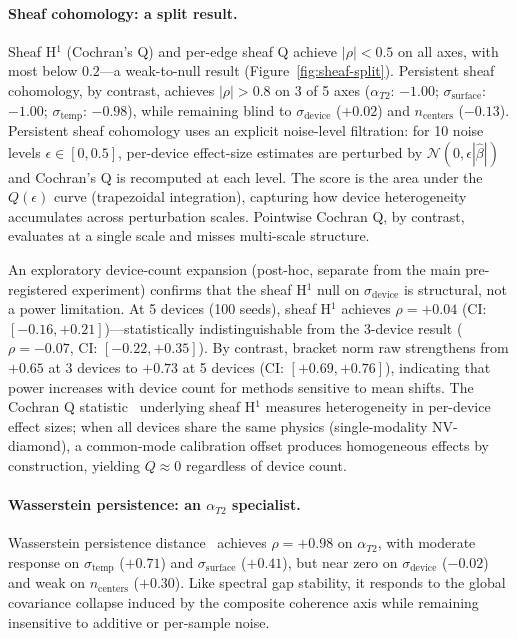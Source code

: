 \documentclass[11pt]{article}
\begin{document}
\paragraph{Sheaf cohomology: a split result.}
Sheaf H$^1$ (Cochran's Q) and per-edge sheaf Q achieve $|\rho| < 0.5$
on all axes, with most below $0.2$---a weak-to-null result
(Figure~\ref{fig:sheaf-split}).
Persistent sheaf cohomology, by contrast, achieves
$|\rho| > 0.8$ on 3 of 5 axes ($\alpha_{T2}$: $-1.00$;
$\sigma_\text{surface}$: $-1.00$; $\sigma_\text{temp}$: $-0.98$),
while remaining blind to $\sigma_\text{device}$ ($+0.02$) and
$n_\text{centers}$ ($-0.13$).  Persistent sheaf cohomology uses an explicit noise-level
filtration: for 10 noise levels $\epsilon \in [0, 0.5]$, per-device
effect-size estimates are perturbed by $\mathcal{N}(0,
\epsilon|\hat\beta|)$ and Cochran's Q is recomputed at each level.
The score is the area under the $Q(\epsilon)$ curve (trapezoidal
integration), capturing how device heterogeneity accumulates across
perturbation scales.  Pointwise Cochran Q, by contrast, evaluates at a
single scale and misses multi-scale structure.

An exploratory device-count expansion (post-hoc, separate from the main
pre-registered experiment) confirms that the sheaf H$^1$ null on
$\sigma_\text{device}$ is structural, not a power limitation.
At 5 devices (100 seeds), sheaf H$^1$ achieves $\rho = +0.04$
(CI: $[-0.16, +0.21]$)---statistically indistinguishable from the
3-device result ($\rho = -0.07$, CI: $[-0.22, +0.35]$).  By
contrast, bracket norm raw strengthens from $+0.65$ at 3 devices
to $+0.73$ at 5 devices (CI: $[+0.69, +0.76]$), indicating that
power increases with device count for methods sensitive to mean
shifts.  The Cochran Q statistic~\citep{cochran1954combination} underlying sheaf
H$^1$ measures heterogeneity in per-device effect sizes; when all devices share
the same physics (single-modality NV-diamond), a common-mode
calibration offset produces homogeneous effects by construction,
yielding $Q \approx 0$ regardless of device count.

\paragraph{Wasserstein persistence: an $\alpha_{T2}$ specialist.}
Wasserstein persistence distance~\citep{villani2009optimal} achieves
$\rho = +0.98$ on $\alpha_{T2}$, with moderate response on
$\sigma_\text{temp}$ ($+0.71$) and $\sigma_\text{surface}$ ($+0.41$),
but near zero on $\sigma_\text{device}$ ($-0.02$) and weak on
$n_\text{centers}$ ($+0.30$).
Like spectral gap stability, it responds to the global covariance
collapse induced by the composite coherence axis while remaining
insensitive to additive or per-sample noise.
\end{document}
